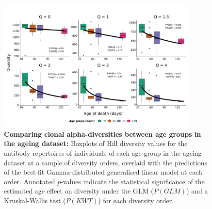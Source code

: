 \begin{figure}
\centering
\includegraphics[width = 0.9\textwidth]{_Figures/png/ageing-clone-diversity-solo-fit-gamma}
\caption[Comparing clonal alpha-diversities between age groups in the \igseq ageing dataset]{\textbf{Comparing clonal alpha-diversities between age groups in the \igseq ageing dataset:} Boxplots of Hill diversity values for the antibody repertoires of individuals of each age group in the \igseq ageing dataset at a sample of diversity orders, overlaid with the predictions of the best-fit Gamma-distributed generalised linear model at each order.  Annotated $p$-values indicate the statistical significance of the estimated age effect on diversity under the GLM ($P(GLM)$) and a Kruskal-Wallis test ($P(KWT)$) for each diversity order.}
\label{fig:igseq-ageing-clone-diversity-solo-fit-gamma}
\end{figure}

